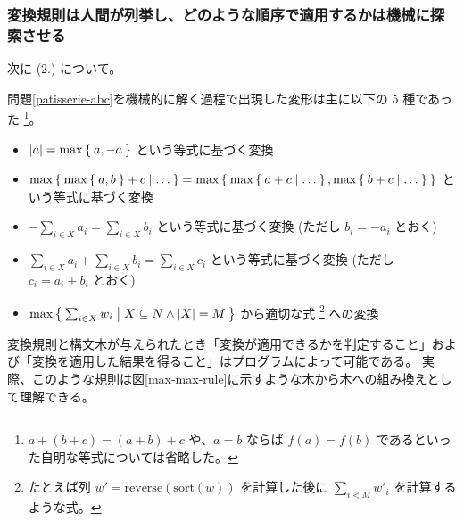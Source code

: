 \documentclass{ltjsarticle}
\begin{document}
\subsubsection{変換規則は人間が列挙し、どのような順序で適用するかは機械に探索させる}

次に (2.) について。

問題\ref{patisserie-abc}を機械的に解く過程で出現した変形は主に以下の $5$ 種であった \footnote{$a + (b + c) = (a + b) + c$ や、$a = b$ ならば $f(a) = f(b)$ であるといった自明な等式については省略した。}。

\begin{itemize}
    \item $\lvert a \rvert = \max \Set{ a, -a }$ という等式に基づく変換
    \item $\max \Set{ \max \Set{ a, b } + c | \dots } = \max \Set{ \max \Set{ a + c | \dots }, \max \Set{ b + c | \dots } }$ という等式に基づく変換
    \item $- \sum_{i \in X} a_i = \sum_{i \in X} b_i$ という等式に基づく変換 (ただし $b_i = - a_i$ とおく)
    \item $\sum_{i \in X} a_i + \sum_{i \in X} b_i = \sum_{i \in X} c_i$ という等式に基づく変換 (ただし $c_i = a_i + b_i$ とおく)
    \item $\max \Set{ \sum_{i \in X} w_i | X \subseteq N \land \lvert X \rvert = M }$ から適切な式 \footnote{たとえば列 $w' = \mathrm{reverse}(\mathrm{sort}(w))$ を計算した後に $\sum_{i < M} w'_i$ を計算するような式。} への変換
\end{itemize}


変換規則と構文木が与えられたとき「変換が適用できるかを判定すること」および「変換を適用した結果を得ること」はプログラムによって可能である。
実際、このような規則は図\ref{max-max-rule}に示すような木から木への組み換えとして理解できる。
\end{document}
